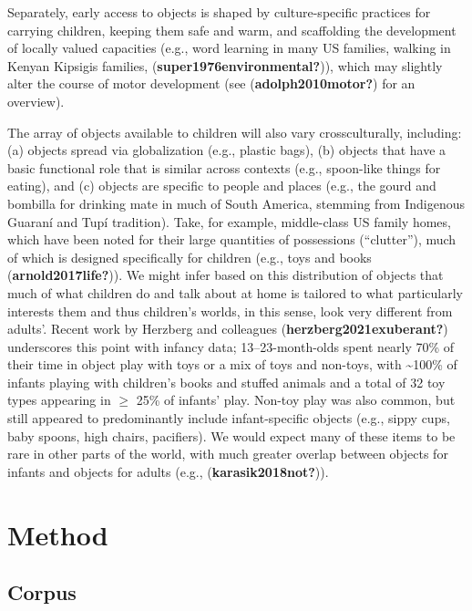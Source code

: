 \documentclass[10pt, letterpaper]{article}
\begin{document}
Separately, early access to objects is shaped by culture-specific
practices for carrying children, keeping them safe and warm, and
scaffolding the development of locally valued capacities (e.g., word
learning in many US families, walking in Kenyan Kipsigis families,
(\textbf{super1976environmental?})), which may slightly alter the course
of motor development (see (\textbf{adolph2010motor?}) for an overview).

The array of objects available to children will also vary
crossculturally, including: (a) objects spread via globalization (e.g.,
plastic bags), (b) objects that have a basic functional role that is
similar across contexts (e.g., spoon-like things for eating), and (c)
objects are specific to people and places (e.g., the gourd and bombilla
for drinking mate in much of South America, stemming from Indigenous
Guaraní and Tupí tradition). Take, for example, middle-class US family
homes, which have been noted for their large quantities of possessions
(``clutter''), much of which is designed specifically for children
(e.g., toys and books (\textbf{arnold2017life?})). We might infer based
on this distribution of objects that much of what children do and talk
about at home is tailored to what particularly interests them and thus
children's worlds, in this sense, look very different from adults'.
Recent work by Herzberg and colleagues (\textbf{herzberg2021exuberant?})
underscores this point with infancy data; 13--23-month-olds spent nearly
70\% of their time in object play with toys or a mix of toys and
non-toys, with \textasciitilde100\% of infants playing with children's
books and stuffed animals and a total of 32 toy types appearing in
\(\ge\) 25\% of infants' play. Non-toy play was also common, but still
appeared to predominantly include infant-specific objects (e.g., sippy
cups, baby spoons, high chairs, pacifiers). We would expect many of
these items to be rare in other parts of the world, with much greater
overlap between objects for infants and objects for adults (e.g.,
(\textbf{karasik2018not?})).

\hypertarget{method}{%
\section{Method}\label{method}}

\hypertarget{corpus}{%
\subsection{Corpus}\label{corpus}}
\end{document}
